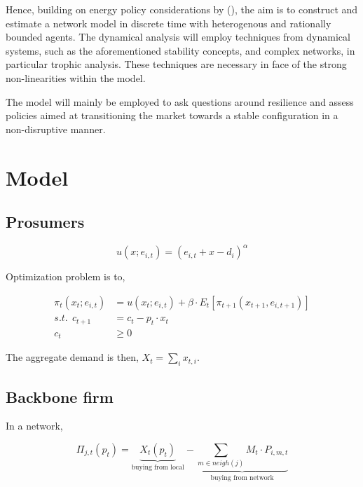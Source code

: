 \documentclass[american]{scrartcl}
\begin{document}
Hence, building on energy policy considerations by \citeauthor{Parag2016} (\citeyear{Parag2016}), the aim is to construct and estimate a network model in discrete time with heterogenous and rationally bounded agents. The dynamical analysis will employ techniques from dynamical systems, such as the aforementioned stability concepts, and complex networks, in particular trophic analysis. These techniques are necessary in face of the strong non-linearities within the model.

The model will mainly be employed to ask questions around resilience and assess policies aimed at transitioning the market towards a stable configuration in a non-disruptive manner.

\newpage
{} %
\printbibliography

\appendix

\section{Model}

\iffalse
    \subsection{Network structure}

    \centering
    \begin{tikzpicture}[->]
        \node[main node] (1) {Local\\market};
        \node[main node] (2) [right = 2cm of 1] {Firm 1};
        \node[main node] (3) [right above = 2cm of 2] {Firm 2};

    \end{tikzpicture}
\fi

\subsection{Prosumers}

\begin{equation*}
    u(x; e_{i, t}) = (e_{i, t} + x - d_i)^{\alpha}
\end{equation*}

Optimization problem is to,

\begin{equation*}
    \begin{split}
        \pi_t(x_t; e_{i, t}) &= u(x_t; e_{i, t}) + \beta \cdot E_t \left[ \pi_{t+1}(x_{t+1}, e_{i, t+1}) \right] \\
        s.t. \ \ c_{t+1} &= c_t - p_t \cdot x_t \\
        c_t &\geq 0
    \end{split}
\end{equation*}

The aggregate demand is then, $X_t = \sum_i x_{t, i}$.

\subsection{Backbone firm}

In a network,

\begin{equation*}
    \Pi_{j, t}(p_{t}) = \underbrace{X_t(p_t)}_{\text{buying from local}} - \underbrace{\sum_{m \in neigh(j)} M_t \cdot P_{i, m, t}}_{\text{buying from network}}
\end{equation*}
\end{document}

